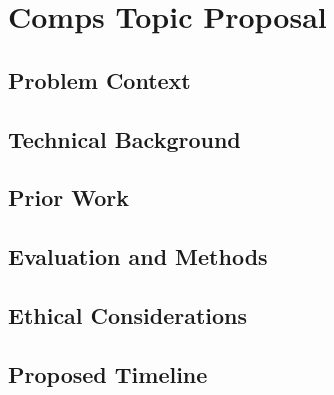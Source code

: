 \documentclass[10pt,twocolumn]{article}
\begin{document}
\section{Comps Topic Proposal}

\subsection{Problem Context}

\subsection{Technical Background}

\subsection{Prior Work}	

\subsection{Evaluation and Methods}

\subsection{Ethical Considerations}

\subsection{Proposed Timeline}



\printbibliography
\end{document}
